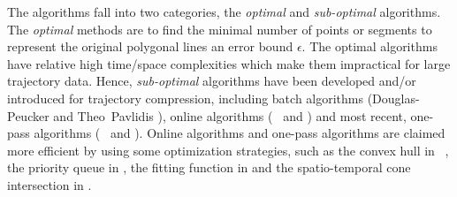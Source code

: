 The \lsa algorithms fall into two categories, \ie the \textit{optimal} and \textit{sub-optimal} algorithms. 
The \textit{optimal} methods\cite{Imai:Optimal,Chan:Optimal} are to find the minimal number of points or segments to represent the original polygonal lines \wrt an error bound $\epsilon$.
%
The optimal \lsa algorithms have relative high time/space complexities which make them impractical for large trajectory data.
Hence, \textit{sub-optimal} \lsa algorithms have been developed and/or introduced for trajectory compression, including batch algorithms (\eg Douglas-Peucker \cite{Douglas:Peucker, Meratnia:Spatiotemporal, Cao:Spatio} and Theo~Pavlidis \cite{Pavlidis:Segment}), online algorithms (\eg~\bqsa\cite{Liu:BQS} and \squishe \cite{Muckell:Compression}) and most recent, one-pass algorithms (\eg~\operb \cite{Lin:Operb} and \cised \cite{Lin:Cised}). Online algorithms and one-pass algorithms are claimed more efficient by using some optimization strategies, such as the convex hull in \bqsa~\cite{Liu:BQS}, the priority queue in \squishe \cite{Muckell:Compression}, the {fitting function} in \operb \cite {Lin:Operb} and the spatio-temporal cone intersection in \cised \cite {Lin:Cised}. 

